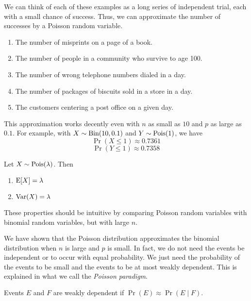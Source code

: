\documentclass{article}
\begin{document}
\begin{example}
  We can think of each of these examples as a long series of independent trial, each with a small chance of success.
  Thus, we can approximate the number of successes by a Poisson random variable.
  \begin{enumerate}
    \item The number of misprints on a page of a book.
    \item The number of people in a community who survive to age 100.
    \item The number of wrong telephone numbers dialed in a day.
    \item The number of packages of biscuits sold in a store in a day.
    \item The customers centering a post office on a given day.
  \end{enumerate}
\end{example}

\begin{remark}
  This approximation works decently even with $n$ as small as $10$ and $p$ as large as $0.1$.
  For example, with $X \sim \textnormal{Bin}(10, 0.1)$ and $Y \sim \textnormal{Pois}(1)$, we have
  \[
    \Pr(X \leq 1) \approx 0.7361
  \]
  \[
    \Pr(Y \leq 1) \approx 0.7358
  \]
\end{remark}

\begin{theorem}
  Let $X \sim \textnormal{Pois}(\lambda)$.
  Then
  \begin{enumerate}
    \item $\operatorname{E}[X] = \lambda$
    \item $\operatorname{Var}(X) = \lambda$
  \end{enumerate}
\end{theorem}
These properties should be intuitive by comparing Poisson random variables with binomial random variables, but with large $n$.

We have shown that the Poisson distribution approximates the binomial distribution when $n$ is large and $p$ is small.
In fact, we do not need the events be independent or to occur with equal probability.
We just need the probability of the events to be small and the events to be at most weakly dependent.
This is explained in what we call the \emph{Poisson paradigm}.

\begin{definition}
  Events $E$ and $F$ are weakly dependent if $\Pr(E) \approx \Pr(E \mid F)$.
\end{definition}
\end{document}
